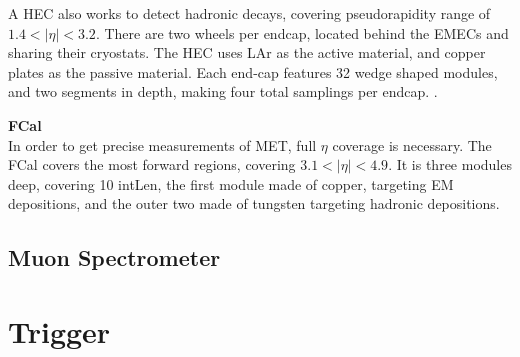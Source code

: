 A \gls{HEC} also works to detect hadronic decays, covering pseudorapidity range of $1.4 < |\eta| < 3.2$. There are two wheels per endcap, located behind the \glspl{EMEC} and sharing their cryostats. The \gls{HEC} uses \gls{LAr} as the active material, and copper plates as the passive material. Each end-cap features 32 wedge shaped modules, and two segments in depth, making four total samplings per endcap. \cite{lar-tdr}.

    
\noindent\textbf{\gls{FCal}}\\
\indent In order to get precise measurements of \gls{MET}, full $\eta$ coverage is necessary. The \gls{FCal} covers the most forward regions, covering $3.1 < |\eta| < 4.9$. It is three modules deep, covering 10 \gls{intLen}, the first module made of copper, targeting \gls{EM} depositions, and the outer two made of tungsten targeting hadronic depositions.



\subsection{Muon Spectrometer}
\section{Trigger}


